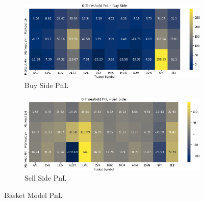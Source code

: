 \documentclass{article}
\begin{document}
\begin{figure}[h!]
  \centering
  \begin{subfigure}{.5\textwidth}
    \centering
    \includegraphics[width=.95\linewidth]{../Figures/basket_buy_pnl.png}
    \caption{Buy Side PnL}
  \end{subfigure}%
  \begin{subfigure}{.5\textwidth}
    \centering
    \includegraphics[width=.95\linewidth]{../Figures/basket_sell_pnl.png}
    \caption{Sell Side PnL}
  \end{subfigure}
  \caption{Basket Model PnL}
\end{figure}
\end{document}

